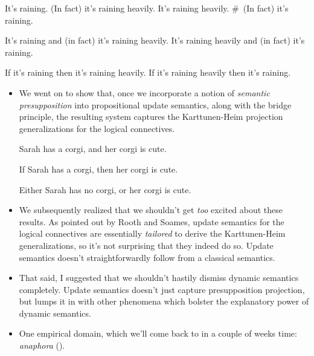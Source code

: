 \documentclass[nols,twoside,nofonts,nobib,nohyper]{tufte-handout}
\theoremstyle{definition}
\begin{document}
\begin{itemize}
\pex
\a It's raining. (In fact) it's raining heavily.
\a It's raining heavily. \# (In fact) it's raining.
\xe

\pex
\a It's raining and (in fact) it's raining heavily.
\a\ljudge{\#}It's raining heavily and (in fact) it's raining.
\xe

\pex
\a If it's raining then it's raining heavily.
\a\ljudge{\#}If it's raining heavily then it's raining.
\xe

\end{itemize}

\begin{itemize}

    \item We went on to show that, once we incorporate a notion of \textit{semantic presupposition} into propositional update semantics, along with the bridge principle, the resulting system captures the Karttunen-Heim projection generalizations for the logical connectives.

    \ex
    Sarah has a corgi, and her corgi is cute.
    \xe

    \ex
    If Sarah has a corgi, then her corgi is cute.
    \xe

    \ex
      Either Sarah has no corgi, or her corgi is cute.
    \xe

\end{itemize}

\begin{itemize}

    \item We subsequently realized that we shouldn't get \textit{too} excited about these results. As pointed out by Rooth and Soames, update semantics for the logical connectives are essentially \textit{tailored} to derive the Karttunen-Heim generalizations, so it's not surprising that they indeed do so. Update semantics doesn't straightforwardly follow from a classical semantics.

    \item That said, I suggested that we shouldn't hastily dismiss dynamic semantics completely. Update semantics doesn't just capture presupposition projection, but lumps it in with other phenomena which bolster the explanatory power of dynamic semantics.

    \item One empirical domain, which we'll come back to in a couple of weeks time: \textit{anaphora} (\citealt{Heim1982,GroenendijkStokhof1991}).

    \end{itemize}
\end{document}

